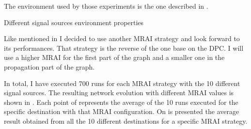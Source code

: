 The environment used by those experiments is the one described in 
.

\begin{table}[h]
	
	\caption{Different signal sources environment properties}
	\label{tbl:source_properties}
\end{table}

Like mentioned in  I decided to use another 
\ac{MRAI} strategy and look forward to its performances.
That strategy is the reverse of the one base on the \ac{DPC}.
I will use a higher \ac{MRAI} for the first part of the graph and a smaller 
one in the propagation part of the graph.

In total, I have executed \num{700} runs for each \ac{MRAI} strategy with the 
\num{10} different signal sources.
The resulting network evolution with different \ac{MRAI} values is shown in 
.
Each point of  represents the average 
of the \num{10} runs executed for the specific destination with that \ac{MRAI}
configuration.
On  is presented the average result
obtained from all the \num{10} different destinations for a specific \ac{MRAI}
strategy.

